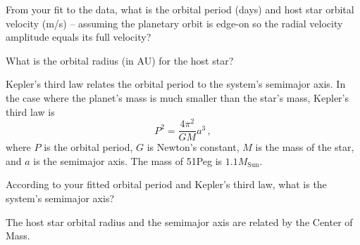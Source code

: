 %

\begin{steps}
	\item From your fit to the data, what is the orbital period (days) and host star orbital velocity (m/s) -- assuming the planetary orbit is edge-on so the radial velocity amplitude equals its full velocity?
	
	\item What is the orbital radius (in AU) for the host star?
\end{steps}

Kepler's third law relates the orbital period to the system's semimajor axis. In the case where the planet’s mass is much smaller than the star’s mass, Kepler's third law is
\begin{equation}
 P^2=\frac{4 \pi^2}{GM} a^3 \,,
\end{equation}
where $P$ is the orbital period, $G$ is Newton's constant, $M$ is the mass of the star, and $a$ is the semimajor axis. The mass of 51Peg is $1.1 M_\textrm{Sun}$.

\begin{steps}
	\item According to your fitted orbital period and Kepler's third law, what is the system's semimajor axis?
\end{steps}

The host star orbital radius and the semimajor axis are related by the Center of Mass.


